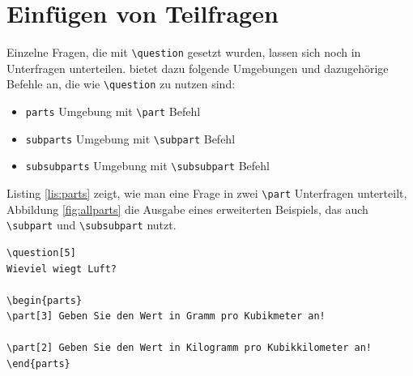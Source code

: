 \clearpage

\section{Einfügen von Teilfragen}

Einzelne Fragen, die mit \texttt{\textbackslash question} gesetzt wurden, lassen sich noch in Unterfragen unterteilen. 
 bietet dazu folgende Umgebungen und dazugehörige Befehle an, die wie \texttt{\textbackslash question} zu nutzen sind:

\begin{itemize}
	\item \texttt{parts} Umgebung mit \texttt{\textbackslash part} Befehl
	\item \texttt{subparts} Umgebung mit \texttt{\textbackslash subpart} Befehl
	\item \texttt{subsubparts} Umgebung mit \texttt{\textbackslash subsubpart} Befehl
\end{itemize}

Listing \ref{lis:parts} zeigt, wie man eine Frage in zwei \texttt{\textbackslash part} Unterfragen unterteilt, Abbildung \ref{fig:allparts} die Ausgabe eines erweiterten Beispiels, das auch \texttt{\textbackslash subpart} und \texttt{\textbackslash subsubpart} nutzt.

\begin{lstlisting}[caption={Beispiel für die Nutzung von \texttt{parts} und \texttt{\textbackslash part}}, label={lis:parts}]
\question[5]
Wieviel wiegt Luft?

\begin{parts}
\part[3] Geben Sie den Wert in Gramm pro Kubikmeter an!

\part[2] Geben Sie den Wert in Kilogramm pro Kubikkilometer an!
\end{parts}
\end{lstlisting}


